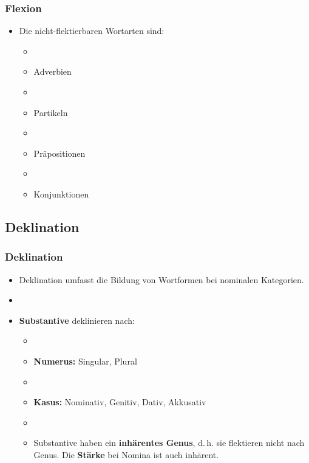 
\begin{frame}
\frametitle{Flexion}

\begin{itemize}
	\item Die nicht-flektierbaren Wortarten sind:
	
	\begin{itemize}
		\item[]
		\item Adverbien
		\item[]
		\item Partikeln
		\item[]
		\item Präpositionen
		\item[]
		\item Konjunktionen
	\end{itemize}
\end{itemize}


\end{frame}




\subsection{Deklination}



\begin{frame}
\frametitle{Deklination}

\begin{itemize}
	\item Deklination umfasst die Bildung von Wortformen bei nominalen Kategorien.
	\item[]
	\item \textbf{Substantive} deklinieren nach:
	
	\begin{itemize}
		\item[]
		\item \textbf{Numerus:} Singular, Plural
		\item[]
		\item \textbf{Kasus:} Nominativ, Genitiv, Dativ, Akkusativ
		\item[]
		\item Substantive haben ein \textbf{inhärentes Genus}, d.\,h. sie flektieren nicht nach Genus. Die \textbf{Stärke} bei Nomina ist auch inhärent.
	\end{itemize}
	
\end{itemize}

\end{frame}



